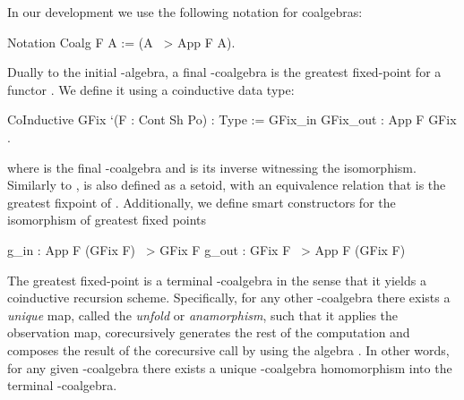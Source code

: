 \documentclass[ a4paper, UKenglish, cleveref, autoref, thm-restate]{lipics-v2021}
\begin{document}
In our development we use the following notation for coalgebras:
\begin{coqcode}
Notation Coalg F A := (A ~> App F A).
\end{coqcode}

Dually to the initial -algebra, a final -coalgebra is the greatest
fixed-point for a functor . We define it using a coinductive data type:
\begin{coqcode}
CoInductive GFix `(F : Cont Sh Po) : Type := GFix_in { GFix_out : App F GFix }.
\end{coqcode}
where  is the final -coalgebra and  is its
inverse witnessing the isomorphism. Similarly to ,  is also
defined as a setoid, with an equivalence relation that is the greatest fixpoint
of . Additionally, we define smart constructors for the isomorphism of
greatest fixed points
\begin{coqcode}
g_in : App F (GFix F) ~> GFix F                g_out : GFix F ~> App F (GFix F)
\end{coqcode}

The greatest fixed-point is a terminal -coalgebra in the sense that it
yields a coinductive recursion scheme. Specifically, for any
other -coalgebra there exists a \emph{unique} map, called the
\emph{unfold} or \emph{anamorphism}, such that it applies the observation map,
corecursively generates the rest of the computation and composes the result of
the corecursive call by using the algebra . In other words, for any
given -coalgebra there exists a unique -coalgebra homomorphism
into the terminal -coalgebra.

\end{document}

